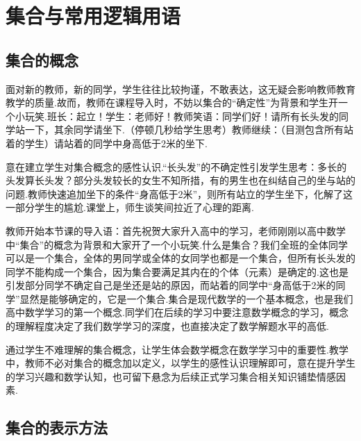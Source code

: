 \chapter{集合与常用逻辑用语}
\section{集合的概念}
\begin{intro}
面对新的教师，新的同学，学生往往比较拘谨，不敢表达，这无疑会影响教师教育教学的质量.故而，教师在课程导入时，不妨以集合的“确定性”为背景和学生开一个小玩笑.班长：起立！学生：老师好！教师笑语：同学们好！请所有长头发的同学站一下，其余同学请坐下.（停顿几秒给学生思考）教师继续：（目测包含所有站着的学生）请站着的同学中身高低于2米的坐下.
\end{intro}
\begin{purpose}
意在建立学生对集合概念的感性认识.“长头发”的不确定性引发学生思考：多长的头发算长头发？部分头发较长的女生不知所措，有的男生也在纠结自己的坐与站的问题.教师快速追加坐下的条件“身高低于2米”，则所有站立的学生坐下，化解了这一部分学生的尴尬.课堂上，师生谈笑间拉近了心理的距离.
\end{purpose}

\begin{intro}
    教师开始本节课的导入语：首先祝贺大家升入高中的学习，老师刚刚以高中数学中“集合”的概念为背景和大家开了一个小玩笑.什么是集合？我们全班的全体同学可以是一个集合，全体的男同学或全体的女同学也都是一个集合，但所有长头发的同学不能构成一个集合，因为集合要满足其内在的个体（元素）是确定的.这也是引发部分同学不确定自己是坐还是站的原因，而站着的同学中“身高低于2米的同学”显然是能够确定的，它是一个集合.集合是现代数学的一个基本概念，也是我们高中数学学习的第一个概念.同学们在后续的学习中要注意数学概念的学习，概念的理解程度决定了我们数学学习的深度，也直接决定了数学解题水平的高低.
\end{intro}
\begin{purpose}
通过学生不难理解的集合概念，让学生体会数学概念在数学学习中的重要性.教学中，教师不必对集合的概念加以定义，以学生的感性认识理解即可，意在提升学生的学习兴趣和数学认知，也可留下悬念为后续正式学习集合相关知识铺垫情感因素.
\end{purpose}

\section{集合的表示方法}